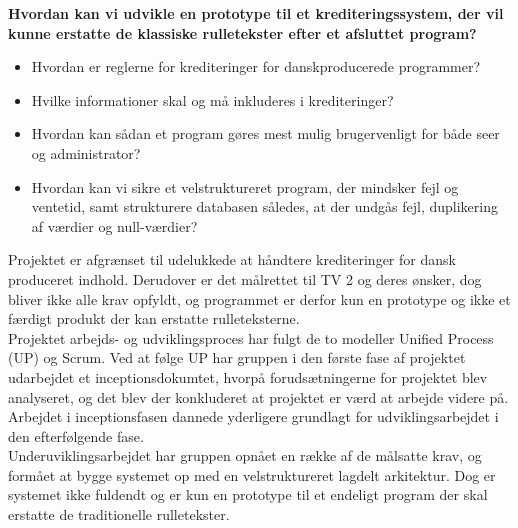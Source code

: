 \textbf{Hvordan kan vi udvikle en prototype til et krediteringssystem, der vil kunne erstatte de klassiske rulletekster efter et afsluttet program?}
\begin{itemize}
    \item Hvordan er reglerne for krediteringer for danskproducerede programmer?
    \item Hvilke informationer skal og må inkluderes i krediteringer?
    \item Hvordan kan sådan et program gøres mest mulig brugervenligt for både seer og administrator?
    \item Hvordan kan vi sikre et velstruktureret program, der mindsker fejl og ventetid, samt strukturere databasen således, at der undgås fejl, duplikering af værdier og null-værdier?
\end{itemize}
Projektet er afgrænset til udelukkede at håndtere krediteringer for dansk produceret indhold. Derudover er det målrettet til TV 2 og deres ønsker, dog bliver ikke alle krav opfyldt, og programmet er derfor kun en prototype og ikke et færdigt produkt der kan erstatte rulleteksterne. \\
Projektet arbejds- og udviklingsproces har fulgt de to modeller Unified Process (UP) og Scrum. Ved at følge UP har gruppen i den første fase af projektet udarbejdet et inceptionsdokumtet, hvorpå forudsætningerne for projektet blev analyseret, og det blev der konkluderet at projektet er værd at arbejde videre på. Arbejdet i inceptionsfasen dannede yderligere grundlagt for udviklingsarbejdet i den efterfølgende fase. \\
Underuviklingsarbejdet har gruppen opnået en række af de målsatte krav, og formået at bygge systemet op med en velstruktureret lagdelt arkitektur. Dog er systemet ikke fuldendt og er kun en prototype til et endeligt program der skal erstatte de traditionelle rulletekster.
